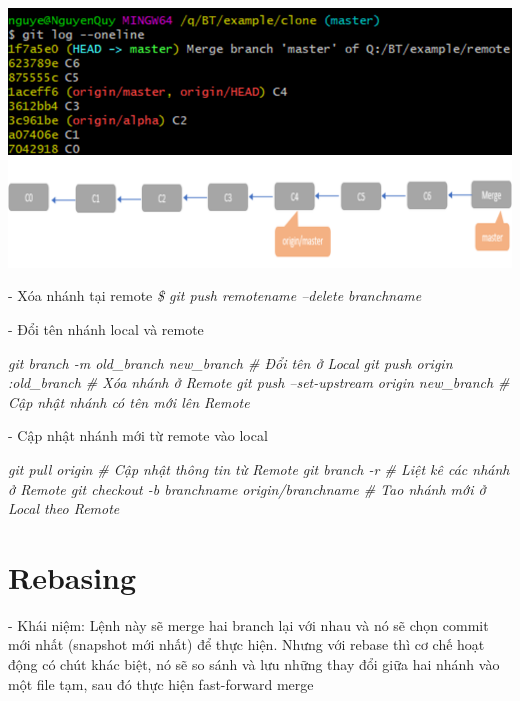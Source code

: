 \documentclass[12pt,a4paper]{report}
\begin{document}
 \includegraphics[width=0.8\linewidth]{screenshot076}
 	\label{fig:screenshot076}
\vskip 0.4cm\vskip 0.4cm
 	\includegraphics[width=0.8\linewidth]{screenshot077}

 	\label{fig:screenshot077}
\vskip 0.4cm\vskip 0.4cm
 - Xóa nhánh tại remote
 \vskip 0.4cm
 {\it \hspace{1cm} \$ git push remotename --delete branchname}\vskip 0.4cm
 
 - Đổi tên nhánh local và remote\vskip 0.4cm
 
 {\it \hspace{1cm}git branch -m old\_branch new\_branch         \hspace{1cm} \# Đổi tên ở Local\vskip 0.1cm
  \hspace{1cm}git push origin :old\_branch                  \hspace{1cm}\# Xóa nhánh ở Remote\vskip 0.1cm
  \hspace{1cm}git push --set-upstream origin new\_branch   \# Cập nhật nhánh có tên mới lên  Remote\vskip 0.4cm }

 - Cập nhật nhánh mới từ remote vào local\vskip 0.4cm
 
 {\it \hspace{1cm}git pull origin                                    \hspace{1cm}\# Cập nhật thông tin từ Remote\vskip 0.1cm
  \hspace{1cm}git branch -r                                      \hspace{1cm}\# Liệt kê các nhánh ở Remote\vskip 0.1cm
  \hspace{1cm}git checkout -b branchname  origin/branchname      \hspace{1cm}\# Tao nhánh mới ở Local theo Remote\vskip 0.4cm}
 
							
\section{Rebasing}
\hspace{0.6cm}- Khái niệm: Lệnh này sẽ merge hai branch lại với nhau và nó sẽ chọn commit mới nhất (snapshot mới nhất) để thực hiện. Nhưng với rebase thì cơ chế hoạt động có chút khác biệt, nó sẽ so sánh và lưu những thay đổi giữa hai nhánh vào một file tạm, sau đó thực hiện fast-forward merge
\newpage
\end{document}
